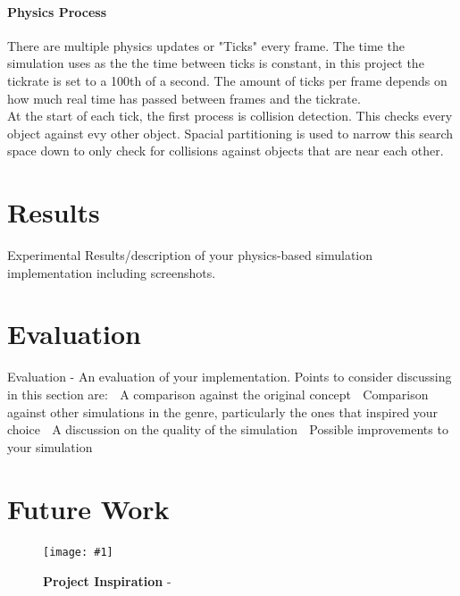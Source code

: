 \documentclass[conference]{acmsiggraph}
\newcommand{\figuremacroW}[4]{
	\begin{figure}[h] %
		\centering
		\texttt{[image: \#1]}
		\caption[#2]{\textbf{#2} - #3}
		\label{fig:#1}
	\end{figure}
}
\begin{document}
\paragraph{Physics Process}
There are multiple physics updates or "Ticks" every frame. The time the simulation uses as the the time between ticks is constant, in this project the tickrate	is set to a 100th of a second. The amount of ticks per frame depends on how much real time has passed between frames and the tickrate.\\	
At the start of each tick, the first process is collision detection. This checks every object against evy other object. Spacial partitioning is used to narrow this search space down to only check for collisions against objects that are near each other.
	
\section{Results}
Experimental Results/description of your physics-based simulation implementation
including screenshots.

\section{Evaluation}
Evaluation - An evaluation of your implementation. Points to consider discussing in this
section are:
 A comparison against the original concept
 Comparison against other simulations in the genre, particularly the ones that
inspired your choice
 A discussion on the quality of the simulation
 Possible improvements to your simulation

\section{Future Work}


\figuremacroW
{balls2}
{Project Inspiration}
{\protect\cite{advert}}
{0.96}





\end{document}
